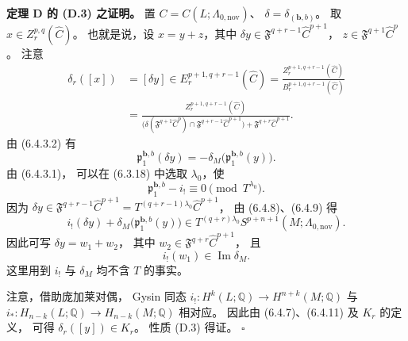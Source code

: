 \noindent\textbf{定理 D 的 \textup{(D.3)} 之证明。}
置 $C=C(L;\Lambda_{0,\mathrm{nov}})$、
$\delta=\delta_{(\boldsymbol b,b)}$。
取 $x\in Z_r^{p,q}(\widehat C)$。
也就是说，设 $x=y+z$，其中
$\delta y\in\mathfrak F^{q+r-1}
\widehat C^{p+1}$，
$z\in\mathfrak F^{q+1}\widehat C^p$。
注意
\begin{equation}
\begin{aligned}
\delta_r([x])
&=[\delta y]
\in E_r^{p+1,q+r-1}(\widehat C)
=\frac{Z_r^{p+1,q+r-1}(\widehat C)}
{B_r^{p+1,q+r-1}(\widehat C)}\\
&=\frac{Z_r^{p+1,q+r-1}(\widehat C)}
{\bigl(
\delta(\mathfrak F^{q+1}\widehat C^p)
\cap\mathfrak F^{q+r-1}\widehat C^{p+1}
\bigr)+\mathfrak F^{q+r}\widehat C^{p+1}}.
\end{aligned}
\tag{6.4.7}\label{eq:6-4-7}
\end{equation}
由 (6.4.3.2) 有
\begin{equation}
\mathfrak p_1^{\boldsymbol b,b}(\delta y)
=-\delta_M\bigl(\mathfrak p_1^{\boldsymbol b,b}(y)\bigr).
\tag{6.4.8}\label{eq:6-4-8}
\end{equation}
由 (6.4.3.1)，
可以在 (6.3.18) 中选取 $\lambda_0$，使
\begin{equation}
\mathfrak p_1^{\boldsymbol b,b}-i_!
\equiv0\pmod{T^{\lambda_0}}.
\tag{6.4.9}\label{eq:6-4-9}
\end{equation}
因为
$\delta y\in\mathfrak F^{q+r-1}\widehat C^{p+1}
=T^{(q+r-1)\lambda_0}\widehat C^{p+1}$，
由 (6.4.8)、(6.4.9) 得
\begin{equation}
i_!(\delta y)
+\delta_M\bigl(\mathfrak p_1^{\boldsymbol b,b}(y)\bigr)
\in T^{(q+r)\lambda_0}
S^{p+n+1}(M;\Lambda_{0,\mathrm{nov}}).
\tag{6.4.10}\label{eq:6-4-10}
\end{equation}
因此可写 $\delta y=w_1+w_2$，
其中
$w_2\in\mathfrak F^{q+r}\widehat C^{p+1}$，
且
\begin{equation}
i_!(w_1)\in\operatorname{Im}\delta_M.
\tag{6.4.11}\label{eq:6-4-11}
\end{equation}
这里用到 $i_!$ 与 $\delta_M$
均不含 $T$ 的事实。

注意，借助庞加莱对偶，
Gysin 同态
$i_!:H^k(L;\mathbb Q)
\to H^{n+k}(M;\mathbb Q)$
与
$i_*:H_{n-k}(L;\mathbb Q)
\to H_{n-k}(M;\mathbb Q)$
相对应。
因此由 (6.4.7)、(6.4.11)
及 $K_r$ 的定义，
可得 $\delta_r([y])\in K_r$。
性质 \textup{(D.3)} 得证。
\hfill$\square$


